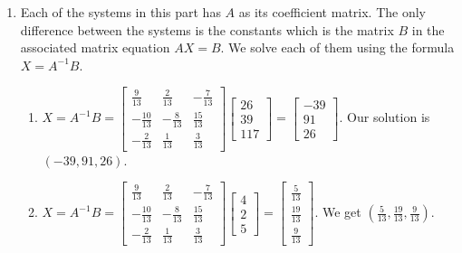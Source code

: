\documentclass{ximera}
\begin{document}
\begin{ex}
\begin{enumerate}
\item Each of the systems in this part has $A$ as its coefficient matrix.  The only difference between the systems is the constants which is the matrix $B$ in the associated matrix equation $AX=B$.  We solve each of them using the formula $X = A^{-1}B$.

\begin{enumerate}

\item $X = A^{-1}B = \left[ \begin{array}{rrr} \frac{9}{13} & \frac{2}{13} & -\frac{7}{13} \\[3pt] -\frac{10}{13} & -\frac{8}{13} & \frac{15}{13} \\[3pt] -\frac{2}{13} & \frac{1}{13} & \frac{3}{13} \end{array} \right] \left[ \begin{array}{r} 26 \\[3pt] 39 \\[3pt] 117 \end{array}\right] =  \left[ \begin{array}{r} -39 \\[3pt] 91 \\[3pt] 26 \end{array}\right]$.  Our solution is $(-39,91,26)$.

\item $X = A^{-1}B = \left[ \begin{array}{rrr} \frac{9}{13} & \frac{2}{13} & -\frac{7}{13} \\[3pt] -\frac{10}{13} & -\frac{8}{13} & \frac{15}{13} \\[3pt] -\frac{2}{13} & \frac{1}{13} & \frac{3}{13}  \end{array} \right] \left[ \begin{array}{r} 4 \\[3pt] 2 \\[3pt] 5 \end{array}\right] =  \left[ \begin{array}{r} \frac{5}{13} \\[3pt] \frac{19}{13} \\[3pt] \frac{9}{13} \end{array}\right]$.  We get $\left( \frac{5}{13},  \frac{19}{13},  \frac{9}{13}   \right)$.


\end{enumerate}
\end{enumerate}
\end{ex}
\end{document}
